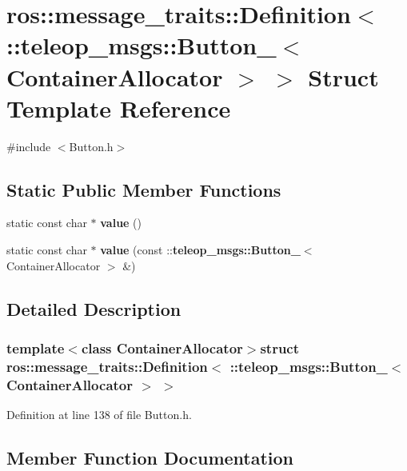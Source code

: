 \section{ros::message\_\-traits::Definition$<$ ::teleop\_\-msgs::Button\_\-$<$ ContainerAllocator $>$ $>$ Struct Template Reference}
\label{structros_1_1message__traits_1_1Definition_3_01_1_1teleop__msgs_1_1Button___3_01ContainerAllocator_01_4_01_4}


{\ttfamily \#include $<$Button.h$>$}

\subsection*{Static Public Member Functions}
\begin{DoxyCompactItemize}
\item 
static const char $\ast$ {\bf value} ()
\item 
static const char $\ast$ {\bf value} (const ::{\bf teleop\_\-msgs::Button\_\-}$<$ ContainerAllocator $>$ \&)
\end{DoxyCompactItemize}


\subsection{Detailed Description}
\subsubsection*{template$<$class ContainerAllocator$>$struct ros::message\_\-traits::Definition$<$ ::teleop\_\-msgs::Button\_\-$<$ ContainerAllocator $>$ $>$}



Definition at line 138 of file Button.h.



\subsection{Member Function Documentation}
